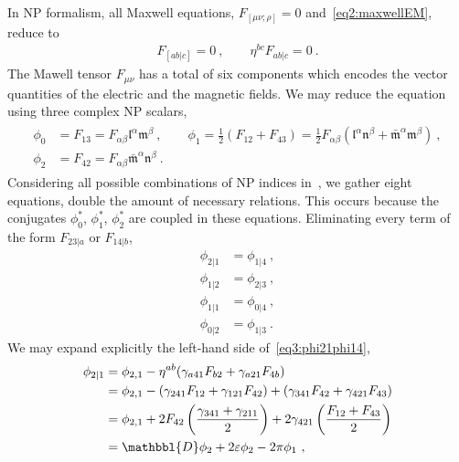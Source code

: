 In NP formalism, all Maxwell equations, $F_{[\mu\nu ; \rho]}=0$ and~\eqref{eq2:maxwellEM}, reduce to
\begin{align}
    \label{eq3:maxwellFabEqs}
    F_{[ab \rvert c]} = 0 ~,\qquad \eta^{bc} F_{ab \rvert c} = 0 ~.
\end{align}
The Mawell tensor $F_{\mu\nu}$ has a total of six components which encodes the vector quantities of the electric and the magnetic fields. We may reduce the equation using three complex NP scalars,
\begin{align}
    \label{eq3:maxwellNPphi}
    \begin{split}
        \phi_0 &= F_{13} = F_{\alpha\beta} \mathfrak{l}^\alpha \mathfrak{m}^\beta ~,\qquad
        \phi_1 = \tfrac{1}{2} (F_{12} + F_{43}) = \tfrac{1}{2} F_{\alpha\beta} (\mathfrak{l}^\alpha \mathfrak{n}^\beta + \bar{\mathfrak{m}}^\alpha \mathfrak{m}^\beta) ~,\\
        \phi_2 &= F_{42} = F_{\alpha\beta} \bar{\mathfrak{m}}^\alpha \mathfrak{n}^\beta ~.
    \end{split}
\end{align}
Considering all possible combinations of NP indices in~, we gather eight equations, double the amount of necessary relations. 
This occurs because the conjugates $\phi_0^*$, $\phi_1^*$, $\phi_2^*$ are coupled in these equations. Eliminating every term of the form $F_{23\rvert a}$ or $F_{14\rvert b}$, 
\begin{subequations}
    \begin{align}
        \phi_{2\rvert 1} &= \phi_{1\rvert 4} ~, \label{eq3:phi21phi14}\\
        \phi_{1\rvert 2} &= \phi_{2\rvert 3} ~, \label{eq3:phi12phi23}\\
        \phi_{1\rvert 1} &= \phi_{0\rvert 4} ~, \label{eq3:phi11phi04}\\
        \phi_{0\rvert 2} &= \phi_{1\rvert 3} ~. \label{eq3:phi02phi13}
    \end{align}
\end{subequations}
We may expand explicitly the left-hand side of~\eqref{eq3:phi21phi14},
\begin{align}
    \label{eq3:phi21SpinCoef}
    \begin{split}
        \phi_{2\rvert 1} &= \phi_{2, 1} - \eta^{ab}( \gamma_{a41} F_{b2} + \gamma_{a21} F_{4b} ) \\
        &= \phi_{2, 1} - (\gamma_{241} F_{12} + \gamma_{121} F_{42}) + ( \gamma_{341} F_{42} + \gamma_{421} F_{43} ) \\
        &= \phi_{2, 1} + 2 F_{42} \left(\frac{\gamma_{341} + \gamma_{211}}{2}\right) + 2 \gamma_{421} \left(\frac{F_{12} + F_{43}}{2}\right) \\
        &= \mathbbl{D} \phi_2 + 2 \varepsilon \phi_2 - 2 \pi \phi_1 ~,
    \end{split}
\end{align}
